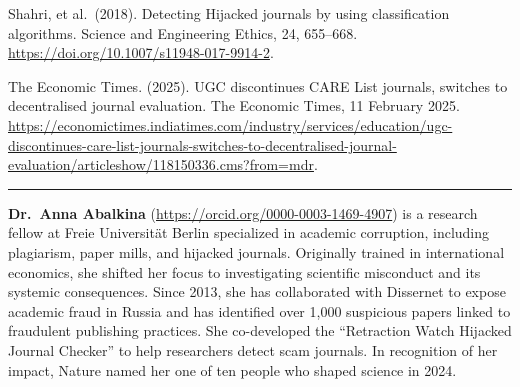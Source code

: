 \documentclass[a4paper,
fontsize=11pt,
oneside,
numbers=noperiodatend,
parskip=half-,
bibliography=totoc,
final
]{scrartcl}
\begin{document}
Shahri, et al.~(2018). Detecting Hijacked journals by using
classification algorithms. Science and Engineering Ethics, 24, 655--668.
\url{https://doi.org/10.1007/s11948-017-9914-2}.

The Economic Times. (2025). UGC discontinues CARE List journals,
switches to decentralised journal evaluation. The Economic Times, 11
February 2025.
\url{https://economictimes.indiatimes.com/industry/services/education/ugc-discontinues-care-list-journals-switches-to-decentralised-journal-evaluation/articleshow/118150336.cms?from=mdr}.

\begin{center}\rule{0.5\linewidth}{0.5pt}\end{center}

\textbf{Dr.~Anna Abalkina} (\url{https://orcid.org/0000-0003-1469-4907})
is a research fellow at Freie Universität Berlin specialized in academic
corruption, including plagiarism, paper mills, and hijacked journals.
Originally trained in international economics, she shifted her focus to
investigating scientific misconduct and its systemic consequences. Since
2013, she has collaborated with Dissernet to expose academic fraud in
Russia and has identified over 1,000 suspicious papers linked to
fraudulent publishing practices. She co-developed the ``Retraction Watch
Hijacked Journal Checker'' to help researchers detect scam journals. In
recognition of her impact, Nature named her one of ten people who shaped
science in 2024.
\end{document}
